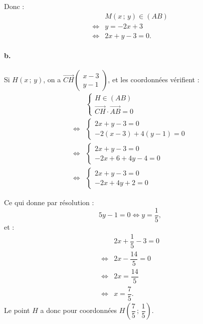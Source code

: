Donc :
\begin{align*}
&M(x\,;\,y) \in (AB) \\
\iff &y = -2x + 3 \\
\iff &2x + y - 3 = 0.
\end{align*}

\paragraph{b.} Si \(H(x\,;\,y)\), on a \(\overrightarrow{CH} \begin{pmatrix} x - 3 \\ y - 1 \end{pmatrix}\), et les coordonnées vérifient :
\begin{align*}
&\begin{cases} 
H \in (AB) \\ 
\overrightarrow{CH} \cdot \overrightarrow{AB} = 0
\end{cases} \\
\iff &\begin{cases} 
2x + y - 3 = 0 \\ 
-2(x - 3) + 4(y - 1) = 0 
\end{cases} \\
\iff &\begin{cases}
2x + y - 3 = 0 \\
-2x + 6 + 4y - 4 = 0
\end{cases} \\
\iff &\begin{cases}
2x + y - 3 = 0 \\
-2x + 4y + 2 = 0
\end{cases}
\end{align*}

Ce qui donne par résolution :
\[
5y - 1 = 0 \iff y = \dfrac{1}{5},
\]
et :
\begin{align*}
&2x + \dfrac{1}{5} - 3 = 0 \\
\iff &2x - \dfrac{14}{5} = 0 \\
\iff &2x = \dfrac{14}{5} \\
\iff &x = \dfrac{7}{5}.
\end{align*}
Le point \(H\) a donc pour coordonnées \(H\left( \dfrac{7}{5}\,;\,\dfrac{1}{5} \right)\).
